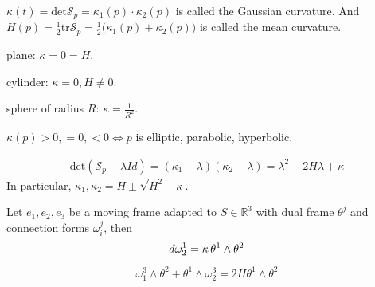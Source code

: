 \documentclass[10pt]{article}
\begin{document}
            \begin{definition}
                $\kappa(t) = \text{det}\mathcal{S}_p = \kappa_1(p)\cdot\kappa_2(p)$ is called the Gaussian curvature. And $H(p) = \frac{1}{2}\text{tr}\mathcal{S}_p = \frac{1}{2}\big(\kappa_1(p)+\kappa_2(p)\big)$ is called the mean curvature.
            \end{definition}
            
            \begin{example}
                plane: $\kappa = 0 = H$.

                cylinder: $\kappa = 0, H\neq 0$.

                sphere of radius $R$: $\kappa = \frac{1}{R^2}$.
            \end{example}
            \begin{remark}
                $\kappa(p) > 0, =0, < 0\Longleftrightarrow p$ is elliptic, parabolic, hyperbolic.
            \end{remark}
            \begin{proposition}
                \begin{equation*}
                    \begin{aligned}
                        \text{det}(\mathcal{S}_p - \lambda Id) = (\kappa_1-\lambda)(\kappa_2-\lambda) = \lambda^2 - 2H\lambda + \kappa
                    \end{aligned}
                \end{equation*}
                In particular, $\kappa_1, \kappa_2 = H \pm \sqrt{H^2-\kappa}$.
            \end{proposition}
            \begin{proposition}
                Let $e_1, e_2, e_3$ be a moving frame adapted to $S\in\mathbb{R}^3$ with dual frame $\theta^j$ and connection forms $\omega_i^j$, then
                \begin{equation}\label{Equation: domega12}
                    \begin{aligned}
                        d\omega_2^1 = \kappa\thinspace\theta^1\wedge\theta^2
                    \end{aligned}
                \end{equation}
                \begin{equation}\label{Equation: omega theta H}
                    \begin{aligned}
                        \omega_1^3\wedge\theta^2 + \theta^1\wedge\omega_2^3 = 2H\theta^1\wedge\theta^2
                    \end{aligned}
                \end{equation}
            \end{proposition}
\end{document}
